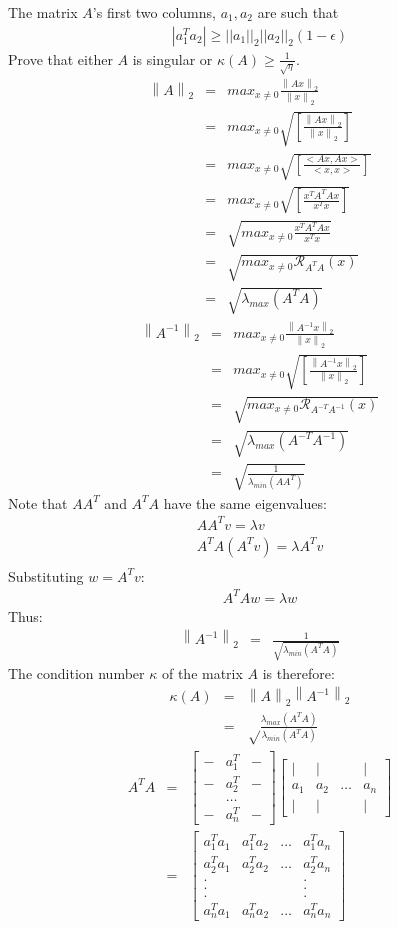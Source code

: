 \documentclass{article}
\newcommand{\ea}[1]{\begin{eqnarray*}#1\end{eqnarray*}}
\newcommand{\twonorm}[1]{\left\|{#1}\right\|_{2}}
\newcommand{\mat}[2]{\left[\begin{array}{#1}#2\end{array}\right]}
\newcommand{\inv}[1]{#1^{-1}}
\newcommand{\R}{\mathcal{R}}
\begin{document}
 The matrix $A$'s first two columns, $a_1,a_2$ are such that \\
\ea{ |a_1^T a_2| \ge ||a_1||_2||a_2||_2(1-\epsilon) }
Prove that either $A$ is singular or $\kappa(A)\ge\frac{1}{\sqrt{\eta}}$.
\ea{
\twonorm{A}&=& max_{x\neq 0} \frac{\twonorm{Ax}}{\twonorm{x} } \\
		   &=& max_{x\neq 0} \sqrt{\left[  
		   \frac{\twonorm{Ax}}{\twonorm{x}} \right] } \\
		   &=& max_{x\neq 0} \sqrt{ \left[ \frac{<Ax,Ax>}{<x,x>} \right] } \\
		   &=& max_{x\neq 0} \sqrt{ \left[ \frac{ x^TA^TAx }{x^Tx} \right] } \\
		   &=& \sqrt{ max_{x\neq 0} \frac{ x^TA^TAx }{x^Tx} } \\
		   &=& \sqrt{ max_{x\neq 0} \R_{A^TA}(x) } \\
		   &=& \sqrt{ \lambda_{max}(A^TA) }
}
\ea{
\twonorm{\inv{A}} &=& max_{x\neq 0} \frac{ \twonorm{\inv{A}x}} { \twonorm{x} } \\
		   &=& max_{x\neq 0} \sqrt{\left[  
		   \frac{\twonorm{\inv{A}x}}{\twonorm{x}} \right] } \\
		   &=& \sqrt{ max_{x\neq 0} \R_{A^{-T}A^{-1}}(x) } \\
	&=& \sqrt{ \lambda_{max}(A^{-T}A^{-1}) } \\
	&=& \sqrt{ \frac{1}{\lambda_{min}(AA^T)} }
}
Note that $AA^T$ and $A^TA$ have the same eigenvalues:
\ea{
	AA^Tv=\lambda v \\
	A^TA(A^Tv)=\lambda A^Tv\\
}
Substituting $w=A^Tv$:
\ea{
	A^TA w = \lambda w
}
Thus:
\ea{
\twonorm{\inv{A}} &=& \frac{1}{\sqrt{\lambda_{min}(A^TA)}}
}
The condition number $\kappa$ of the matrix $A$ is therefore:
\ea{
\kappa(A)&=& \twonorm{A}\twonorm{\inv{A}} \\
&=& \sqrt \frac{\lambda_{max}(A^TA)}{\lambda_{min}(A^TA)}
}
\ea{
A^TA &=& \mat{ccc}{ 
	- & a_1^T & - \\
	- & a_2^T & - \\
	  & \dots & \\
	- & a_n^T & -
	  }
	  \mat{cccc}{
	  | & | & & | \\
	  a_1 & a_2 & \dots & a_n \\
	  | & | & & |
	 }\\
	 &=& \mat{cccc}{
	 	a_1^Ta_1 & a_1^Ta_2 & \dots & a_1^Ta_n \\
		a_2^Ta_1 & a_2^Ta_2 & \dots & a_2^Ta_n \\
		   . & & & . \\
		   . & & & . \\
		   . & & & . \\
		   a_n^Ta_1 & a_n^Ta_2 & \dots & a_n^Ta_n 
		}
}
\end{document}
